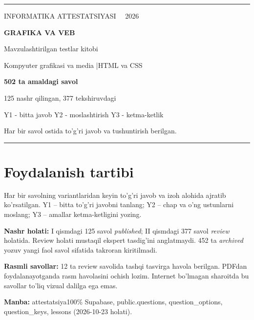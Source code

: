 \documentclass[10pt,a4paper,oneside]{article}
\begin{document}
\begin{titlepage}
\vspace*{30mm}
{\color{teal}\rule{\textwidth}{1.8pt}}\par
\vspace{18mm}
{\Large INFORMATIKA ATTESTATSIYASI \ \ 2026}\par
\vspace{7mm}
{\fontsize{31}{36}\selectfont\bfseries\color{ink}GRAFIKA VA VEB}\par
\vspace{5mm}
{\Large Mavzulashtirilgan testlar kitobi}\par
\vspace{19mm}
{\large Kompyuter grafikasi va media \quad|\quad HTML va CSS}\par
\vspace{13mm}
{\large\textbf{502 ta amaldagi savol}}\par
{\large 125 nashr qilingan, 377 tekshiruvdagi}\par
\vspace{15mm}
{\normalsize Y1 - bitta javob \quad Y2 - moslashtirish \quad Y3 - ketma-ketlik}\par
\vfill
{\color{muted}Har bir savol ostida to'g'ri javob va tushuntirish berilgan.}\par
\vspace{8mm}
{\color{teal}\rule{\textwidth}{1.8pt}}
\end{titlepage}
\section*{Foydalanish tartibi}
Har bir savolning variantlaridan keyin to'g'ri javob va izoh alohida ajratib ko'rsatilgan.
Y1 -- bitta to'g'ri javobni tanlang; Y2 -- chap va o'ng ustunlarni moslang; Y3 -- amallar ketma-ketligini yozing.
\par\textbf{Nashr holati:} I qismdagi 125 savol \textit{published}; II qismdagi 377 savol
\textit{review} holatida. Review holati mustaqil ekspert tasdig'ini anglatmaydi.
452 ta \textit{archived} yozuv yangi faol savol sifatida takroran kiritilmadi.
\par\textbf{Rasmli savollar:} 12 ta review savolida tashqi tasvirga havola berilgan.
PDFdan foydalanayotganda rasm havolasini ochish lozim. Internet bo'lmagan sharoitda
bu savollar to'liq vizual dalilga ega emas.
\par\textbf{Manba:} attestatsiya100\% Supabase, public.questions, question\_options, question\_keys, lessons (2026-10-23 holati).
\tableofcontents
\clearpage
\end{document}
